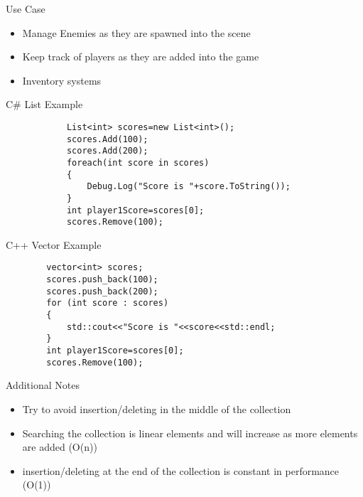 \begin{frame}{Use Case}
	\begin{itemize}
		\pause \item Manage Enemies as they are spawned into the scene
		\pause \item Keep track of players as they are added into the game
		\pause \item Inventory systems 
	\end{itemize}
\end{frame}

\begin{frame}[fragile]{C\# List
	 Example}
			\begin{lstlisting}
			List<int> scores=new List<int>();
			scores.Add(100);
			scores.Add(200);
			foreach(int score in scores)
			{
				Debug.Log("Score is "+score.ToString());
			}
			int player1Score=scores[0];
			scores.Remove(100);
			\end{lstlisting}
\end{frame}

\begin{frame}[fragile]{C++ Vector
	Example}
	\begin{lstlisting}
		vector<int> scores;
		scores.push_back(100);
		scores.push_back(200);
		for (int score : scores)
		{
			std::cout<<"Score is "<<score<<std::endl;
		}
		int player1Score=scores[0];
		scores.Remove(100);
	\end{lstlisting}
\end{frame}

\begin{frame}{Additional Notes}
	\begin{itemize}
		\pause \item Try to avoid insertion/deleting in the middle of the collection
		\pause \item Searching the collection is linear elements and will increase as more elements are added (O(n))
		\pause \item insertion/deleting at the end of the collection is constant in performance (O(1)) 
	\end{itemize}
\end{frame}
